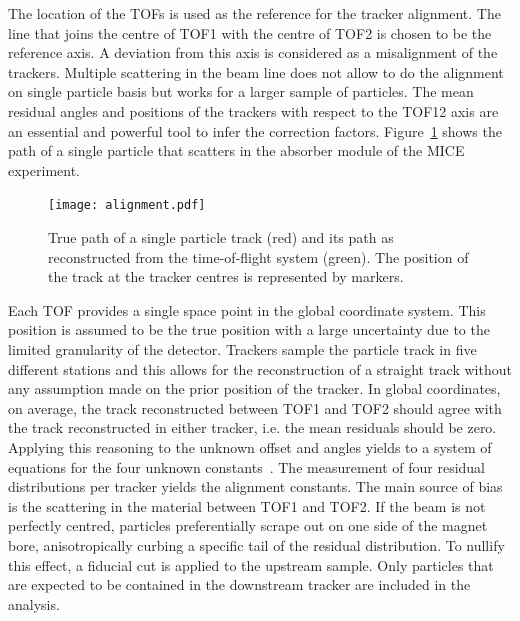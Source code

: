 The location of the TOFs is used as the reference for the tracker alignment. The line that joins the centre of TOF1 with the centre of TOF2 is chosen to be the reference axis. A deviation from this axis is considered as a misalignment of the trackers. Multiple scattering in the beam line does not allow to do the alignment on single particle basis but works for a larger sample of particles. The mean residual angles and positions of the trackers with respect to the TOF12 axis are an essential and powerful tool to infer the correction factors. Figure~\ref{fig:align_bl} shows the path of a single particle that scatters in the absorber module of the MICE experiment.

\begin{figure}
	\begin{center}
		\texttt{[image: alignment.pdf]}
	\end{center}
	\caption{
		True path of a single particle track (red) and its path as reconstructed from the time-of-flight system (green). The position of the track at the tracker centres is represented by markers.
	}
	\label{fig:align_bl}
\end{figure}

Each TOF provides a single space point in the global coordinate system. This position is assumed to be the true position with a large uncertainty due to the limited granularity of the detector.
Trackers sample the particle track in five different stations and this allows for the reconstruction of a straight track without any assumption made on the prior position of the tracker.
In global coordinates, on average, the track reconstructed between TOF1 and TOF2 should agree with the track reconstructed in either tracker, i.e. the mean residuals should be zero. Applying this reasoning to the unknown offset and angles yields to a system of equations for the four unknown constants~\cite{2018arXiv1805.06623T}.
The measurement of four residual distributions per tracker yields the alignment constants.
The main source of bias is the scattering in the material between TOF1 and TOF2. If the beam is not perfectly centred, particles preferentially scrape out on one side of the magnet bore, anisotropically curbing a specific tail of the residual distribution. To nullify this effect, a fiducial cut is applied to the upstream sample. Only particles that are expected to be contained in the downstream tracker are included in the analysis.

